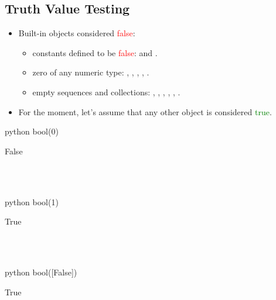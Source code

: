 \documentclass[aspectratio=1610,t]{beamer}
\begin{document}
\subsection{Truth Value Testing}
\begin{pframe}
 \begin{itemize}
 \item Built-in objects considered \textcolor{red}{false}:
 \begin{itemize}
   \item constants defined to be \textcolor{red}{false}:  and .
   \pause
   \item zero of any numeric type: , , ,
         , .
   \pause
   \item empty sequences and collections: , \emp{()}, \emp{[]},
         \emp{\{\}}, , .
  \end{itemize}
  \pause
  \item For the moment, let's assume that any other object is considered
  \textcolor{green}{true}.
 \end{itemize}
 \pause
 \begin{ipython}
  \begin{pythonin}{python}
bool(0)
  \end{pythonin}
  \begin{pythonout}
False
  \end{pythonout}\\ \\
  \begin{pythonin}{python}
bool(1)
  \end{pythonin}
  \begin{pythonout}
True
  \end{pythonout}\\ \\
  \begin{pythonin}{python}
bool([False])
  \end{pythonin}
  \begin{pythonout}
True
  \end{pythonout}
 \end{ipython}
\end{pframe}
\end{document}

